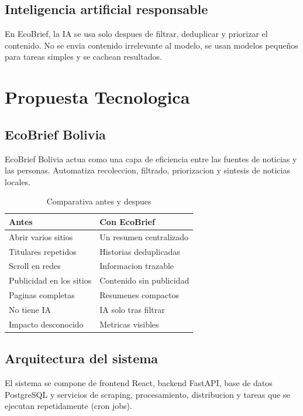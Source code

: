 \documentclass[12pt,oneside]{report}
\begin{document}
\section{Inteligencia artificial responsable}

En EcoBrief, la IA se usa solo despues de filtrar, deduplicar y priorizar el contenido. No se envia contenido irrelevante al modelo, se usan modelos pequeños para tareas simples y se cachean resultados.

\chapter{Propuesta Tecnologica}

\section{EcoBrief Bolivia}

EcoBrief Bolivia actua como una capa de eficiencia entre las fuentes de noticias y las personas. Automatiza recoleccion, filtrado, priorizacion y sintesis de noticias locales.

\begin{table}[H]
\centering
\begin{tabular}{p{6.5cm}p{6.5cm}}
\toprule
\textbf{Antes} & \textbf{Con EcoBrief} \\
\midrule
Abrir varios sitios & Un resumen centralizado \\
Titulares repetidos & Historias deduplicadas \\
Scroll en redes & Informacion trazable \\
Publicidad en los sitios & Contenido sin publicidad \\
Paginas completas & Resumenes compactos \\
No tiene IA & IA solo tras filtrar \\
Impacto desconocido & Metricas visibles \\
\bottomrule
\end{tabular}
\caption{Comparativa antes y despues}
\end{table}

\section{Arquitectura del sistema}

El sistema se compone de frontend React, backend FastAPI, base de datos PostgreSQL y servicios de scraping, procesamiento, distribucion y tareas que se ejecutan repetidamente (cron jobs).
\end{document}
